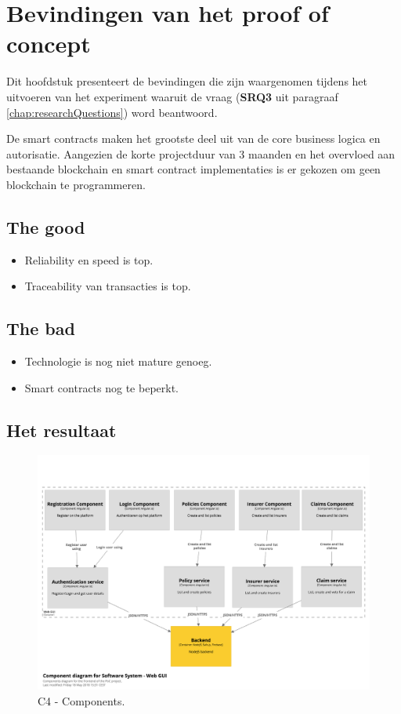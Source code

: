 \chapter{Bevindingen van het proof of concept}\label{chap:q2}
Dit hoofdstuk presenteert de bevindingen die zijn waargenomen tijdens het uitvoeren van het experiment waaruit de vraag \researchQuestionThree (\textbf{SRQ3} uit paragraaf \ref{chap:researchQuestions}) word beantwoord.

De smart contracts maken het grootste deel uit van de core business logica en autorisatie. Aangezien de korte projectduur van 3 maanden en het overvloed aan bestaande blockchain en smart contract implementaties is er gekozen om geen blockchain te programmeren.

\section{The good}
\begin{itemize}
  \item Reliability en speed is top.
  \item Traceability van transacties is top.
\end{itemize}

\section{The bad}
\begin{itemize}
  \item Technologie is nog niet mature genoeg.
  \item Smart contracts nog te beperkt.
\end{itemize}

\newpage

\section{Het resultaat}
\begin{figure}[h!]
    \begin{center}
        \includegraphics[width=\paperwidth-200]{images/components}
        \caption{C4 - Components.}
        \label{fig:c4Compomnents}
    \end{center}
\end{figure}